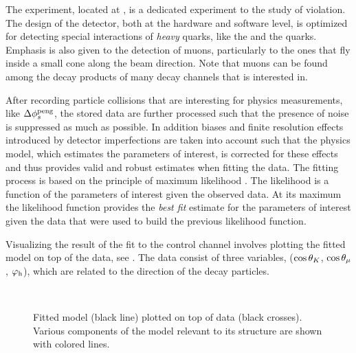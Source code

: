 The \lhcb experiment, located at \cern, is a dedicated experiment to the study of \CP violation.
The design of the detector, both at the hardware and software level, is optimized for detecting
special interactions of {\it heavy} quarks, like the \bquark and the \cquark quarks.
Emphasis is also given to the detection of muons, particularly to the ones that fly
inside a small cone along the beam direction. Note that muons can be found among the decay
products of many decay channels that \lhcb is interested in.

After recording particle collisions that are interesting for physics measurements, like $\Delta\phi_{s}^{\tiny\text{peng}}$,
the stored data are further processed such that the presence of noise is suppressed as much
as possible. In addition biases and finite resolution effects introduced by detector imperfections are
taken into account such that the physics model, which estimates the parameters of interest, is
corrected for these effects and thus provides valid and robust estimates when fitting the data.
The fitting process is based on the principle of maximum likelihood \cite{cowan1998statistical}.
The likelihood is a function of the parameters of interest given the observed data.
At its maximum the likelihood function provides the {\it best fit} estimate for the parameters
of interest given the data that were used to build the previous likelihood function.

Visualizing the result of the fit to the \BsJpsiKst control channel involves plotting the fitted model on top of the data,
see . The data consist of three variables,
($\cos\theta_{K}$, $\cos\theta_{\mu}$, $\varphi_{\rm h}$), which are related to the direction of the \BsJpsiKst decay particles.

\begin{figure}[!t]
  \begin{subfigure}{0.5\textwidth}
    \centering
    \scalebox{1.2}{}
  \end{subfigure}%
  \hfill
  \begin{subfigure}{0.5\textwidth}
    \centering
    \scalebox{1.2}{}
  \end{subfigure}\\
  \begin{subfigure}{\textwidth}
    \centering
    \scalebox{1.2}{}
  \end{subfigure}
  \caption{Fitted model (black line) plotted on top of \BsJpsiKst data (black crosses).
           Various components of the model relevant to its \CP structure are shown with colored lines.}
  \label{app_angular_plot_thetas}
\end{figure}

